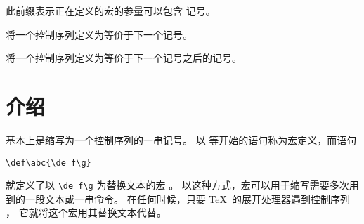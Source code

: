 \documentclass{book}
\begin{document}
\begin{inventory}
\item [\cs{long}] 
      此前缀表示正在定义的宏的参量可以包含  记号。

\item [\cs{let}] 
      将一个控制序列定义为等价于下一个记号。

\item [\cs{futurelet}] 
      将一个控制序列定义为等价于下一个记号之后的记号。

\end{inventory}

\section{介绍}

基本上是缩写为一个控制序列的一串记号。
以  等开始的语句称为{\italic 宏定义}，而语句
\begin{verbatim}
\def\abc{\de f\g}
\end{verbatim}
就定义了以 \verb>\de f\g> 为{\italic 替换文本\/}的宏 。
以这种方式，宏可以用于缩写需要多次用到的一段文本或一串命令。
在任何时候，只要 \TeX\ 的展开处理器遇到控制序列 ，
它就将这个宏用其替换文本代替。
\end{document}
